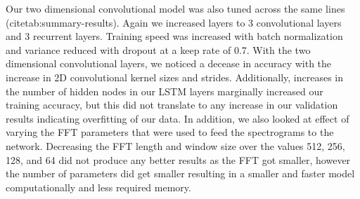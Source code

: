\documentclass{article}
\begin{document}
Our two dimensional convolutional model was also tuned across the same
lines (cite{tab:summary-results}). Again we increased layers to 3
convolutional layers and 3 recurrent layers. Training speed was
increased with batch normalization and variance reduced with dropout
at a keep rate of 0.7. With the two dimensional convolutional layers,
we noticed a decease in accuracy with the increase in 2D convolutional
kernel sizes and strides. Additionally, increases in the number of
hidden nodes in our LSTM layers marginally increased our training
accuracy, but this did not translate to any increase in our validation
results indicating overfitting of our data. In addition, we also
looked at effect of varying the FFT parameters that were used to feed
the spectrograms to the network. Decreasing the FFT length and window
size over the values 512, 256, 128, and 64 did not produce any better
results as the FFT got smaller, however the number of parameters did
get smaller resulting in a smaller and faster model
computationally and less required memory.
\end{document}
